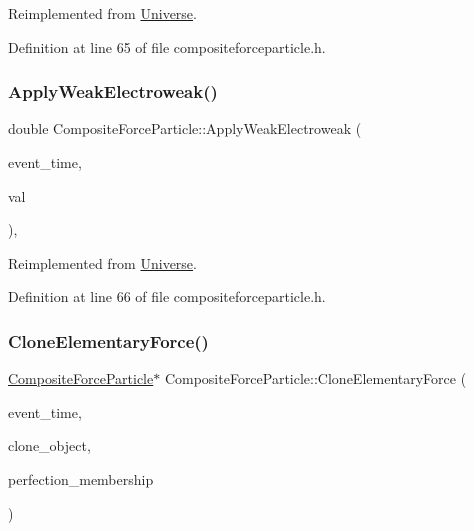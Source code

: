 Reimplemented from \hyperlink{class_universe_a6d1226b3adec3c42a833afdbb6a65a92}{Universe}.



Definition at line 65 of file compositeforceparticle.\+h.

\mbox{\label{class_composite_force_particle_a3c1c0b427c633f0685f1d812e02b92ff}} 
\subsubsection{\texorpdfstring{Apply\+Weak\+Electroweak()}{ApplyWeakElectroweak()}}
{\footnotesize\ttfamily double Composite\+Force\+Particle\+::\+Apply\+Weak\+Electroweak (\begin{DoxyParamCaption}\item[{std\+::chrono\+::time\+\_\+point$<$ \hyperlink{universe_8h_a0ef8d951d1ca5ab3cfaf7ab4c7a6fd80}{Clock} $>$}]{event\+\_\+time,  }\item[{double}]{val }\end{DoxyParamCaption})\hspace{0.3cm}{\ttfamily [inline]}, {\ttfamily [virtual]}}



Reimplemented from \hyperlink{class_universe_a46a906baabb63e5d31f8b48ea1fae52e}{Universe}.



Definition at line 66 of file compositeforceparticle.\+h.

\mbox{\label{class_composite_force_particle_a8163b425c10bd9cb9097d99e5d53d0a1}} 
\subsubsection{\texorpdfstring{Clone\+Elementary\+Force()}{CloneElementaryForce()}}
{\footnotesize\ttfamily \hyperlink{class_composite_force_particle}{Composite\+Force\+Particle}$\ast$ Composite\+Force\+Particle\+::\+Clone\+Elementary\+Force (\begin{DoxyParamCaption}\item[{std\+::chrono\+::time\+\_\+point$<$ \hyperlink{universe_8h_a0ef8d951d1ca5ab3cfaf7ab4c7a6fd80}{Clock} $>$}]{event\+\_\+time,  }\item[{\hyperlink{class_composite_force_particle}{Composite\+Force\+Particle} $\ast$}]{clone\+\_\+object,  }\item[{double}]{perfection\+\_\+membership }\end{DoxyParamCaption})}

